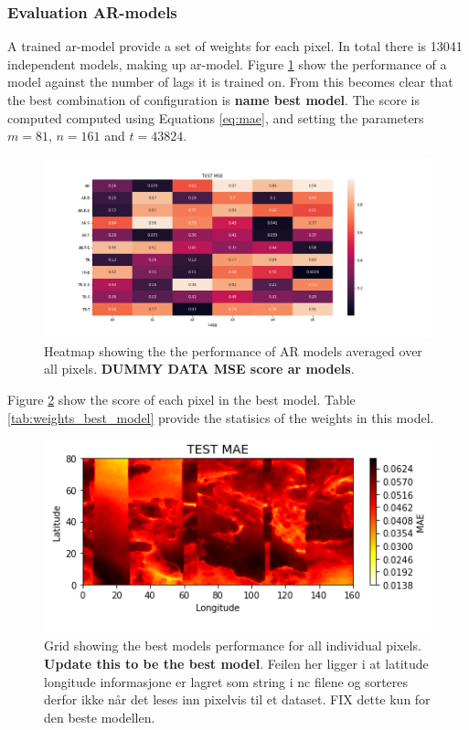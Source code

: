 \subsubsection{Evaluation AR-models}
A trained \acrshort{ar}-model provide a set of weights for each pixel. In total there is 13041 independent models, making up \acrshort{ar}-model. Figure \ref{fig:results_ar_models} show the performance of a model against the number of lags it is trained on. From this becomes clear that the best combination of configuration is \textbf{name best model}. The score is computed computed using Equations \eqref{eq:mae}, and setting the parameters $m = 81$, $n=161$ and $t=43824$.
\begin{figure}
    \centering
    \includegraphics[scale = 0.5]{python_figs/MSE_score_AR_models.png} %
    \caption{Heatmap showing the the performance of AR models averaged over all pixels. \textbf{DUMMY DATA MSE score ar models}.}
    \label{fig:results_ar_models}
\end{figure}
Figure \ref{fig:grid_mse_best_model} show the score of each pixel in the best model. Table \ref{tab:weights_best_model} provide the statisics of the weights in this model.
\begin{figure}
    \centering
    \includegraphics{python_figs/TEST_tcc.png}
    \caption{Grid showing the best models performance for all individual pixels. \textbf{Update this to be the best model}. Feilen her ligger i at latitude longitude informasjone er lagret som string i nc filene og sorteres derfor ikke når det leses inn pixelvis til et dataset. FIX dette kun for den beste modellen.}
    \label{fig:grid_mse_best_model}
\end{figure}

